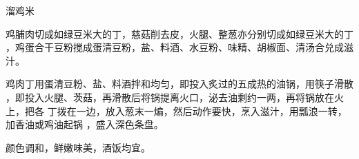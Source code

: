 \begin{recipe}{溜鸡米}

\ingredients


\cooking

\step 鸡脯肉切成如绿豆米大的丁，慈菇削去皮，火腿、整葱亦分别切成如绿豆米大的丁
，鸡蛋合干豆粉搅成蛋清豆粉，盐、料酒、水豆粉、味精、胡椒面、清汤合兑成滋汁。

\step 鸡肉丁用蛋清豆粉、盐、料酒拌和均匀，即投入炙过的五成热的油锅，用筷子滑散
，即投入火腿、茨菇，再滑散后将锅提离火口，泌去油剩约一两，再将锅放在火上，把各
丁拨在一边，放入葱末一煸，然后动作要快，烹入滋汁，用瓢浪一转，加香油或鸡油起锅
，盛入深色条盘。

\notes

颜色调和，鲜嫩味美，酒饭均宜。

\end{recipe}

